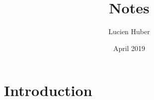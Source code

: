 \documentclass{article}
\title{Notes}
\author{Lucien Huber}
\date{April 2019}
\begin{document}
\maketitle

\section{Introduction}
\end{document}
